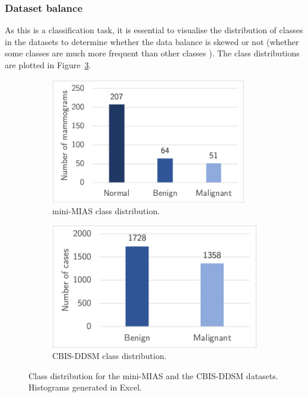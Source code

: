 \subsubsection{Dataset balance}
\label{sec:design-dataset-balance}

As this is a classification task, it is essential to visualise the distribution of classes in the datasets to determine whether the data balance is skewed or not (whether some classes are much more frequent than other classes \citep{Geron2019}). The class distributions are plotted in Figure~\ref{fig:design-datasets-balance}.

\begin{figure}[h]
\centering
\begin{subfigure}{.5\textwidth}
  \centering
  \includegraphics[width=0.94\textwidth]{figures/design/mini-mias-balance.png}
  \caption{mini-MIAS class distribution.}
  \label{fig:design-mini-mias-balance}
\end{subfigure}%
\begin{subfigure}{.5\textwidth}
  \centering
  \includegraphics[width=\textwidth]{figures/design/cbis-ddsm-balance.png}
  \caption{CBIS-DDSM class distribution.}
  \label{fig:cbis-ddsm-balance}
\end{subfigure}
\caption{\label{fig:design-datasets-balance}Class distribution for the mini-MIAS and the CBIS-DDSM datasets. Histograms generated in Excel.}
\end{figure}

